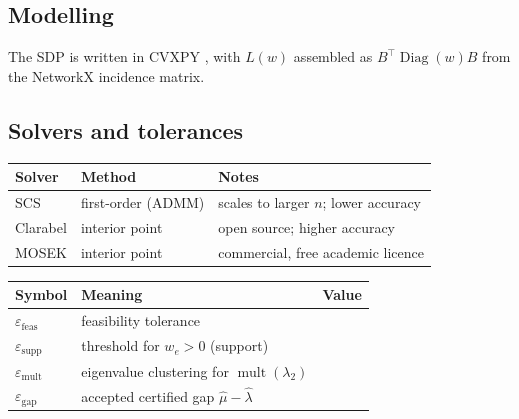 \documentclass[11pt,a4paper]{article}
\newif\ifdraftnotes
\newcommand{\todo}[1]{\ifdraftnotes{\color{red!70!black}\sffamily[TODO: #1]}\fi}
\theoremstyle{plain}
\theoremstyle{definition}
\theoremstyle{remark}
\newcommand{\code}[1]{\texttt{#1}}
\DeclareMathOperator{\Diag}{Diag}
\DeclareMathOperator{\mult}{mult}
\begin{document}
	\subsection{Modelling}
	The SDP is written in CVXPY \cite{DiamondBoyd2016}, with $L(w)$ assembled
	as $B^\top\Diag(w)B$ from the NetworkX \cite{HagbergSchultSwart2008}
	incidence matrix. \todo{Short code excerpt or pseudo-code of
		\code{solve\_ladder(n)}; which variables and constraints; how the dual
		$X$ is read from the LMI constraint, including CVXPY's sign and scaling
		conventions.}
	
	\subsection{Solvers and tolerances}
	\begin{center}
		\small
		\begin{tabular}{@{}llp{7cm}@{}}
			\toprule
			Solver & Method & Notes \\
			\midrule
			SCS \cite{ODonoghueChuParikhBoyd2016} & first-order (ADMM)
			& scales to larger $n$; lower accuracy \\
			Clarabel \cite{GoulartChen2024} & interior point
			& open source; higher accuracy \\
			MOSEK & interior point & commercial, free academic licence \\
			\bottomrule
		\end{tabular}
	\end{center}
	\todo{Which solver is the default and why; tolerance values used.}
	
	\begin{center}
		\small
		\begin{tabular}{@{}lll@{}}
			\toprule
			Symbol & Meaning & Value \\
			\midrule
			$\varepsilon_{\mathrm{feas}}$ & feasibility tolerance & \todo{} \\
			$\varepsilon_{\mathrm{supp}}$ & threshold for $w_e>0$ (support) & \todo{} \\
			$\varepsilon_{\mathrm{mult}}$ & eigenvalue clustering for $\mult(\lambda_2)$ & \todo{} \\
			$\varepsilon_{\mathrm{gap}}$ & accepted certified gap $\hat\mu-\hat\lambda$ & \todo{} \\
			\bottomrule
		\end{tabular}
	\end{center}
	
\end{document}
